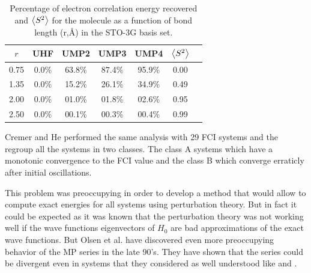 \documentclass[11pt,a4paper]{article}
\begin{document}
\begin{table}[h!]
    \centering
    \begin{tabular}{c c c c c c c}
\hline
 $r$ & UHF & UMP2 & UMP3 & UMP4 & $\expval{S^2}$ \\
\hline
0.75 & 0.0\% & 63.8\% & 87.4\% & 95.9\% & 0.00\\
1.35 & 0.0\% & 15.2\% & 26.1\% & 34.9\% & 0.49\\
2.00 & 0.0\% & 01.0\% & 01.8\% & 02.6\% & 0.95\\
2.50 & 0.0\% & 00.1\% & 00.3\% & 00.4\% & 0.99\\
\hline
\end{tabular}
    \caption{\centering Percentage of electron correlation energy recovered and $\expval{S^2}$ for the  molecule as a function of bond length (r,\si{\angstrom}) in the STO-3G basis set.}
    \label{tab:my_label}
\end{table}

Cremer and He performed the same analysis with 29 FCI systems and the regroup all the systems in two classes. The class A systems which have a monotonic convergence to the FCI value and the class B which converge erraticly after initial oscillations.

This problem was preoccupying in order to develop a method that would allow to compute exact energies for all systems using perturbation theory. But in fact it could be expected as it was known that the perturbation theory was not working well if the wave functions eigenvectors of $H_0$ are bad approximations of the exact wave functions. But Olsen et al. have discovered even more preoccupying behavior of the MP series in the late 90's. They have shown that the series could be divergent even in systems that they considered as well understood like  and . 
\end{document}
